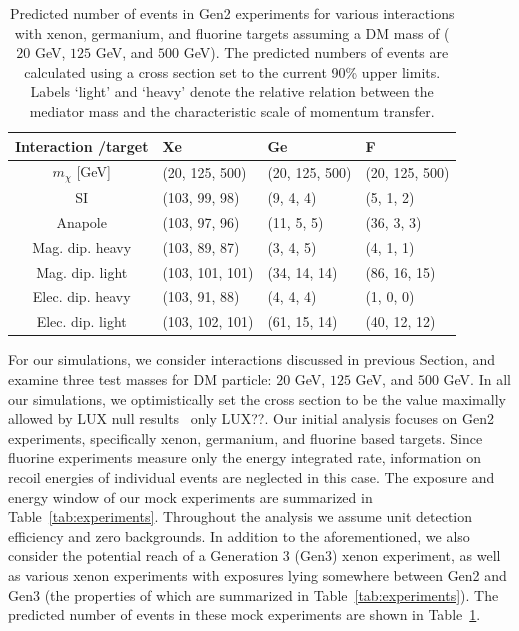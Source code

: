 \documentclass[11pt]{article}
\newcommand{\vgColor}{magenta}
\newcommand{\vg}[1]{{\color{\vgColor} #1}}
\begin{document}
\begin{table}[t] 
\setlength{\extrarowheight}{3pt}
\setlength{\tabcolsep}{12pt}
\begin{center}
\begin{tabular}{c||m{3cm}|m{3cm}|m{3cm}}
Interaction /target & Xe & Ge & F\\
\hline\hline 
$m_\chi$ [GeV] & (20, 125, 500) & (20, 125, 500) & (20, 125, 500) \\
\hline\hline 
SI& (103, 99, 98) & (9, 4, 4)& (5, 1, 2)\\ \hline
Anapole& (103, 97, 96)& (11, 5, 5)& (36, 3, 3)\\ \hline
Mag. dip. heavy& (103, 89, 87)& (3, 4, 5)& (4, 1, 1)\\ \hline
Mag. dip. light& (103, 101, 101)& (34, 14, 14)& (86, 16, 15)\\ \hline
Elec. dip. heavy& (103, 91, 88)& (4, 4, 4)& (1, 0, 0)\\ \hline
Elec. dip. light& (103, 102, 101)& (61, 15, 14)& (40, 12, 12)\\ \hline \hline
\end{tabular}
\end{center}
\caption{Predicted number of events in Gen2 experiments for various interactions with xenon, germanium, and fluorine targets assuming a DM mass of ($20$ GeV, $125$ GeV, and $500$ GeV). The predicted numbers of events are calculated using a cross section set to the current 90\% upper limits. Labels `light' and `heavy' denote the relative relation between the mediator mass and the characteristic scale of momentum transfer. }
\label{tab:pred_events}
\end{table}
For our simulations, we consider interactions discussed in previous Section, and examine three test masses for DM particle: $20$ GeV, $125$ GeV, and $500$ GeV. In all our simulations, we optimistically set the cross section to be the value maximally allowed by LUX null results~\cite{Akerib:2016vxi} \vg{only LUX??}. Our initial analysis focuses on Gen2 experiments, specifically xenon, germanium, and fluorine based targets. Since fluorine experiments measure only the energy integrated rate, information on recoil energies of individual events are neglected in this case.  The exposure and energy window of our mock experiments are summarized in Table~\ref{tab:experiments}. Throughout the analysis we assume unit detection efficiency and zero backgrounds. In addition to the aforementioned, we also consider the potential reach of a Generation 3 (Gen3) xenon experiment, as well as various xenon experiments with exposures lying somewhere between Gen2 and Gen3 (the properties of which are summarized in Table~\ref{tab:experiments}).  The predicted number of events in these mock experiments are shown in Table~\ref{tab:pred_events}. 
\end{document}
